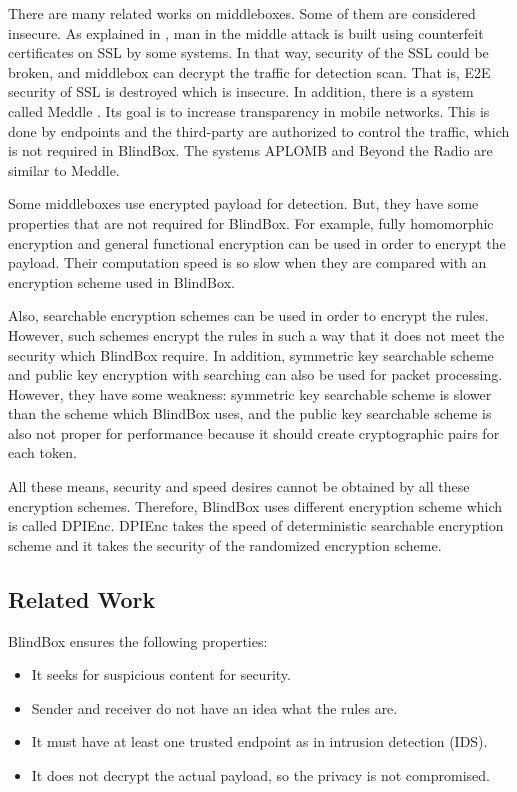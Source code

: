 \documentclass{winslabreport}
\begin{document}
There are many related works on middleboxes. Some of them are considered insecure. As explained in \cite{SSL}, man in the middle attack is built using counterfeit certificates on SSL by some systems. In that way, security of the SSL could be broken, and middlebox can decrypt the traffic for detection scan. That is, E2E security of SSL is destroyed which is insecure. In addition, there is a system called Meddle \cite{Traffic}. Its goal is to increase transparency in mobile networks. This is done by endpoints and the third-party are authorized to control the traffic, which is not required in BlindBox. The systems APLOMB \cite{Network} and Beyond the Radio \cite{48} are similar to Meddle.

Some middleboxes use encrypted payload for detection. But, they have some properties that are not required for BlindBox. For example,  fully homomorphic encryption\cite{24} and general functional encryption \cite{23} can be used in order to encrypt the payload. Their computation speed is so slow when they are compared with an encryption scheme used in BlindBox.

Also, searchable encryption schemes can be used in order to encrypt the rules. However, such schemes encrypt the rules in such a way that it does not meet the security which BlindBox require. In addition, symmetric key searchable scheme \cite{46} and public key encryption with searching  \cite{19} can also be used for packet processing. However, they have some weakness: symmetric key searchable scheme is slower than the scheme which BlindBox uses, and the public key searchable scheme is also not proper for performance because it should create cryptographic pairs for each token.

All these means, security and speed desires cannot be obtained by all these encryption schemes. Therefore, BlindBox uses different encryption scheme which is called DPIEnc. DPIEnc takes the speed of deterministic searchable encryption scheme and it takes the security of the randomized encryption scheme.   

\subsection{Related Work} 

BlindBox ensures the following properties:

\begin{itemize}
	\item It seeks for suspicious content for security. 
	\item Sender and receiver do not have an idea what the rules are.
	\item It must have at least one trusted endpoint as in intrusion detection (IDS). 
	\item It does not decrypt the actual payload, so the privacy is not compromised.
\end{itemize}
\end{document}
